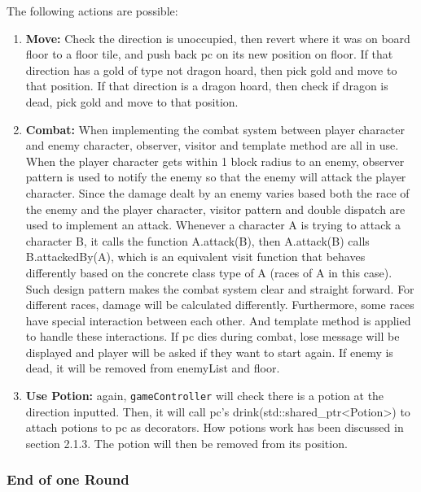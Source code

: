 \documentclass[11pt]{article}
\theoremstyle{plain} \newtheorem{theorem*}{Theorem}[subsection]
\begin{document}
The following actions are possible: 
\begin{enumerate}[leftmargin=*]
\item 
\textbf{Move:} 
Check the direction is unoccupied, then revert where it was on
board \textsf{floor} to a floor tile, and push back pc on its new position on
\textsf{floor}.  If that direction has a gold of type not dragon hoard, then
pick gold and move to that position.  If that direction is a dragon hoard, then
check if dragon is dead, pick gold and move to that position.

\item
\textbf{Combat:} 
When implementing the combat system between player character
and enemy character, observer, visitor and template method are all in use. When
the player character gets within 1 block radius to an enemy, observer pattern
is used to notify the enemy so that the enemy will attack the player character.
Since the damage dealt by an enemy varies based both the race of the enemy and
the player character, visitor pattern and double dispatch are used to implement
an attack. Whenever a character A is trying to attack a character B, it calls
the function \textsf{A.attack(B)}, then \textsf{A.attack(B)} calls \textsf{B.attackedBy(A)}, which is an
equivalent visit function that behaves differently based on the concrete class
type of A (races of A in this case). Such design pattern makes the combat
system clear and straight forward. For different races, damage will be
calculated differently. Furthermore, some races have special interaction
between each other. And template method is applied to handle these interactions.
If pc dies during combat, lose message will be displayed and player will be
asked if they want to start again. If enemy is dead, it will be removed from
\textsf{enemyList} and \textsf{floor}.

\item
\textbf{Use Potion:}
again, \texttt{gameController} will check there is a potion
at the direction inputted. Then, it will call \textsf{pc}'s
\textsf{drink(std::shared\_ptr<Potion>)} to attach potions to \textsf{pc} as 
decorators. How potions work has been discussed in section 2.1.3. The potion
will then be removed from its position. 
\end{enumerate}

\subsubsection{End of one Round}
\end{document}
